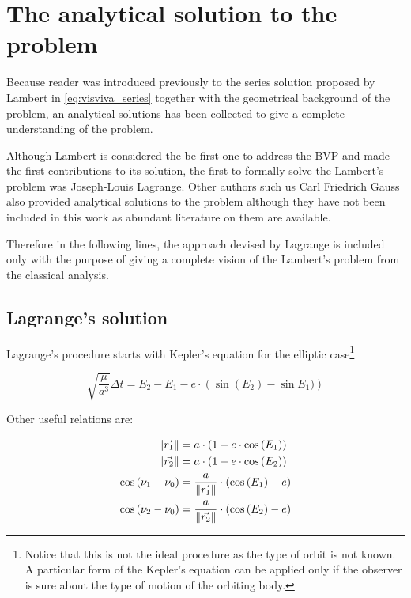 \section{The analytical solution to the problem}

Because reader was introduced previously to the series solution proposed by
Lambert in \ref{eq:visviva_series} together with the geometrical background of
the problem, an analytical solutions has been collected to give a complete
understanding of the problem.

Although Lambert is considered the be first one to address the BVP and made the
first contributions to its solution, the first to formally solve the Lambert's
problem was Joseph-Louis Lagrange. Other authors such us Carl Friedrich Gauss
also provided analytical solutions to the problem although they have not been
included in this work as abundant literature on them are available.

Therefore in the following lines, the approach devised by Lagrange is included
only with the purpose of giving a complete vision of the Lambert's problem from
the classical analysis.

\subsection{Lagrange's solution}

Lagrange's procedure starts with Kepler's equation for the elliptic
case\footnote{Notice that this is not the ideal procedure as the type of orbit
  is not known. A particular form of the Kepler's equation can be applied
  only if the observer is sure about the type of motion of the orbiting
  body.}

\begin{equation}
  \sqrt{\frac{\mu}{a^3}} \Delta t = E_{2} - E_{1} - e \cdot \left(\sin{(E_{2}) -\sin{E_{1}}}) \right)
  \label{eq:kepler_lagrange}
\end{equation}

Other useful relations are:

\begin{align}
  \lVert\vec{r_{1}}\rVert        & = a \cdot (1 - e \cdot \cos{(E_1)})                                \\
  \lVert\vec{r_{2}}\rVert        & = a \cdot (1 - e \cdot \cos{(E_2)})                                \\
  \cos{(\nu_{1} - \nu_{0})} & = \frac{a}{\lVert\vec{r_{1}}\rVert} \cdot \left(\cos{(E_1) - e} \right) \\
  \cos{(\nu_{2} - \nu_{0})} & = \frac{a}{\lVert\vec{r_{2}}\rVert} \cdot \left(\cos{(E_2) - e} \right)
\end{align}

